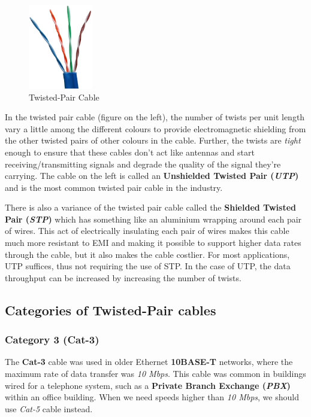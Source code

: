 \begin{figure}
	\centering
	\vspace{-12pt}
	\includegraphics[width=0.25\textwidth]{"Mod1/chapters/1.4.b TwistedPair Cable"}
	\caption{\label{fig:coax_cable}Twisted-Pair Cable}
	\vspace{-10pt}
\end{figure}

In the twisted pair cable (figure on the left), the number of twists per unit length vary a little among the different colours to provide electromagnetic shielding from the other twisted pairs of other colours in the cable. Further, the twists are \textit{tight} enough to ensure that these cables don't act like antennas and start receiving/transmitting signals and degrade the quality of the signal they're carrying. The cable on the left is called an \textbf{Unshielded Twisted Pair (\textit{UTP})} and is the most common twisted pair cable in the industry.

There is also a variance of the twisted pair cable called the \textbf{Shielded Twisted Pair (\textit{STP})} which has something like an aluminium wrapping around each pair of wires. This act of electrically insulating each pair of wires makes this cable much more resistant to EMI and making it possible to support higher data rates through the cable, but it also makes the cable costlier. For most applications, UTP suffices, thus not requiring the use of STP. In the case of UTP, the data throughput can be increased by increasing the number of twists. 

\subsection{Categories of Twisted-Pair cables}
\subsubsection{Category 3 (Cat-3)}
\vspace{-10pt}
The \textbf{Cat-3} cable was used in older Ethernet \textbf{10BASE-T} networks, where the maximum rate of data transfer was \textit{10 Mbps}. This cable was common in buildings wired for a telephone system, such as a \textbf{Private Branch Exchange (\textit{PBX})} within an office building. When we need speeds higher than \textit{10 Mbps}, we should use \textit{Cat-5} cable instead. 

